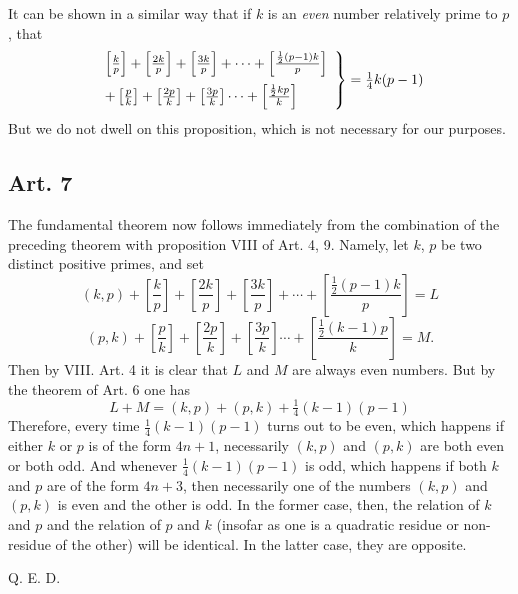 \documentclass{book}
\theoremstyle{plain}
\theoremstyle{remark}
\begin{document}
It can be shown in a similar way that if $k$ is an \emph{even} number relatively prime to $p$, that
\[ \left. \begin{array}{l} \left[\frac{k}{p}\right] + \left[\frac{2k}{p}\right] + \left[\frac{3k}{p}\right] + \cdots + \left[\frac{\frac{1}{2}(p-1)k}{p}\right]  \vspace{2mm}\\
+ \left[\frac{p}{k}\right] + \left[\frac{2p}{k}\right] + \left[\frac{3p}{k}\right]  \cdots + \left[\frac{\frac{1}{2}kp}{k}\right] \end{array} \right\} = \tfrac{1}{4}k(p-1) \]
But we do not dwell on this proposition, which is not necessary for our purposes.

\subsection*{Art. 7} 

The fundamental theorem now follows immediately from the combination of the preceding theorem with proposition VIII of Art. 4, 9.  Namely, let $k$, $p$ be two distinct positive primes, and set
\[ (k,p) + \left[\frac{k}{p}\right] + \left[\frac{2k}{p}\right] + \left[\frac{3k}{p}\right] + \cdots + \left[\frac{\frac{1}{2}(p-1)k}{p}\right] = L \]
\[ (p,k) + \left[\frac{p}{k}\right] + \left[\frac{2p}{k}\right] + \left[\frac{3p}{k}\right]  \cdots + \left[\frac{\frac{1}{2}(k-1)p}{k}\right] = M. \]
Then by VIII. Art. 4 it is clear that $L$ and $M$ are always even numbers.   But by the theorem of Art. 6 one has
\[ L + M = (k,p) + (p,k) + \tfrac{1}{4}(k-1)(p-1) \]
Therefore, every time $\tfrac{1}{4}(k-1)(p-1)$ turns out to be even, which happens if either $k$ or $p$ is of the form $4n+1$, necessarily $(k,p)$ and $(p,k)$ are both even or both odd.  And whenever $\frac{1}{4}(k-1)(p-1)$ is odd, which happens if both $k$ and $p$ are of the form $4n+3$, then necessarily one of the numbers $(k,p)$ and $(p,k)$ is even and the other is odd.  In the former case, then, the relation of $k$ and $p$ and the relation of $p$ and $k$ (insofar as one is a quadratic residue or non-residue of the other) will be identical.  In the latter case, they are opposite. 

\begin{center}
Q. E. D. 
\end{center}
\end{document}
